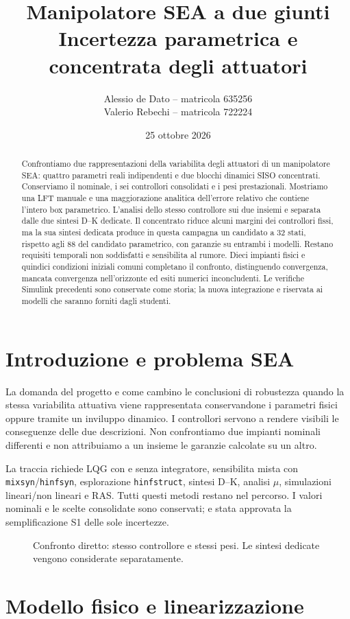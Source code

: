 \documentclass[11pt,a4paper,oneside]{report}
\title{Manipolatore SEA a due giunti\\\large Incertezza parametrica e concentrata degli attuatori}
\author{Alessio de Dato -- matricola 635256\\Valerio Rebechi -- matricola 722224}
\date{25 ottobre 2026}
\newcommand{\schema}[2]{\begin{figure}[htbp]\centering\resizebox{.95\linewidth}{!}{}\caption{#2}\end{figure}}
\begin{document}
\maketitle
\begin{abstract}
Confrontiamo due rappresentazioni della variabilita degli attuatori di un
manipolatore SEA: quattro parametri reali indipendenti e due blocchi dinamici
SISO concentrati. Conserviamo il nominale, i sei controllori consolidati e
i pesi prestazionali. Mostriamo una LFT manuale e una maggiorazione analitica
dell'errore relativo che contiene l'intero box parametrico. L'analisi dello
stesso controllore sui due insiemi e separata dalle due sintesi D--K dedicate.
Il concentrato riduce alcuni margini dei controllori fissi, ma la sua sintesi
dedicata produce in questa campagna un candidato a 32 stati, rispetto agli
88 del candidato parametrico, con garanzie su entrambi i modelli. Restano
requisiti temporali non soddisfatti e sensibilita al rumore. Dieci impianti
fisici e quindici condizioni iniziali comuni completano il confronto,
distinguendo convergenza, mancata convergenza nell'orizzonte ed esiti numerici
inconcludenti. Le verifiche Simulink precedenti sono conservate come storia;
la nuova integrazione e riservata ai modelli che saranno forniti dagli studenti.
\end{abstract}\tableofcontents

\chapter{Introduzione e problema SEA}
La domanda del progetto e come cambino le conclusioni di robustezza quando
la stessa variabilita attuativa viene rappresentata conservandone i parametri
fisici oppure tramite un inviluppo dinamico. I controllori servono a rendere
visibili le conseguenze delle due descrizioni. Non confrontiamo due impianti
nominali differenti e non attribuiamo a un insieme le garanzie calcolate su un altro.

La traccia richiede LQG con e senza integratore, sensibilita mista con
\texttt{mixsyn}/\texttt{hinfsyn}, esplorazione \texttt{hinfstruct}, sintesi D--K,
analisi $\mu$, simulazioni lineari/non lineari e RAS. Tutti questi metodi
restano nel percorso. I valori nominali e le scelte consolidate sono
conservati; e stata approvata la semplificazione S1 delle sole incertezze.
\schema{confronto}{Confronto diretto: stesso controllore e stessi pesi. Le sintesi dedicate vengono considerate separatamente.}

\chapter{Modello fisico e linearizzazione}
\end{document}
